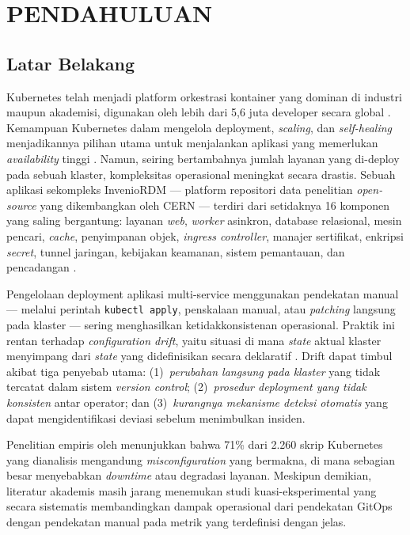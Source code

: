 \chapter{PENDAHULUAN}

\section{Latar Belakang}

Kubernetes telah menjadi platform orkestrasi kontainer yang dominan di industri maupun akademisi, digunakan oleh lebih dari 5,6 juta developer secara global \citep{cncf2024}. Kemampuan Kubernetes dalam mengelola deployment, \textit{scaling}, dan \textit{self-healing} menjadikannya pilihan utama untuk menjalankan aplikasi yang memerlukan \textit{availability} tinggi \citep{burns2016borg}. Namun, seiring bertambahnya jumlah layanan yang di-deploy pada sebuah klaster, kompleksitas operasional meningkat secara drastis. Sebuah aplikasi sekompleks InvenioRDM --- platform repositori data penelitian \textit{open-source} yang dikembangkan oleh CERN --- terdiri dari setidaknya 16 komponen yang saling bergantung: layanan \textit{web}, \textit{worker} asinkron, database relasional, mesin pencari, \textit{cache}, penyimpanan objek, \textit{ingress controller}, manajer sertifikat, enkripsi \textit{secret}, tunnel jaringan, kebijakan keamanan, sistem pemantauan, dan pencadangan \citep{invenio2024}.

Pengelolaan deployment aplikasi multi-service menggunakan pendekatan manual --- melalui perintah \texttt{kubectl apply}, penskalaan manual, atau \textit{patching} langsung pada klaster --- sering menghasilkan ketidakkonsistenan operasional. Praktik ini rentan terhadap \textit{configuration drift}, yaitu situasi di mana \textit{state} aktual klaster menyimpang dari \textit{state} yang didefinisikan secara deklaratif \citep{zhang2026configuration}. Drift dapat timbul akibat tiga penyebab utama: (1)~\textit{perubahan langsung pada klaster} yang tidak tercatat dalam sistem \textit{version control}; (2)~\textit{prosedur deployment yang tidak konsisten} antar operator; dan (3)~\textit{kurangnya mekanisme deteksi otomatis} yang dapat mengidentifikasi deviasi sebelum menimbulkan insiden.

Penelitian empiris oleh \citet{zhang2026configuration} menunjukkan bahwa 71\% dari 2.260 skrip Kubernetes yang dianalisis mengandung \textit{misconfiguration} yang bermakna, di mana sebagian besar menyebabkan \textit{downtime} atau degradasi layanan. Meskipun demikian, literatur akademis masih jarang menemukan studi kuasi-eksperimental yang secara sistematis membandingkan dampak operasional dari pendekatan GitOps dengan pendekatan manual pada metrik yang terdefinisi dengan jelas.

